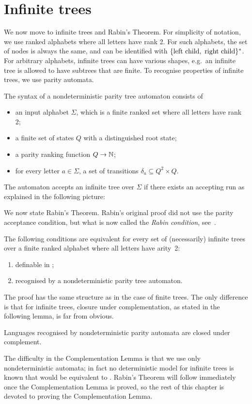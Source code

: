\cite{Figueira:2017hn}


\section{Infinite trees}
\label{sec:rabin}
We now move to infinite trees and Rabin's Theorem. For simplicity of notation, we use ranked alphabets where all letters have rank 2. For such alphabets, the set of nodes is always the same, and can be identified with $\{\text{left child},\text{ right child}\}^*$. For arbitrary alphabets, infinite trees can have various shapes, e.g.~an infinite tree is allowed to have subtrees that are finite.
To recognise properties of infinite trees, we use parity automata.

\begin{definition}\label{def:nondeterministic-parity}
	The syntax of a nondeterministic parity tree automaton consists of 
	\begin{itemize}
		\item an input alphabet $\Sigma$, which is a finite ranked set where all letters have rank 2;
		\item a finite set of states $Q$ with a distinguished root state;		\item a parity ranking function $Q \to \mathbb{N}$;
		\item for every letter $a 
		\in \Sigma$,  a set of transitions $\delta_a  \subseteq Q^2 \times  Q$.
		 	\end{itemize}
The automaton accepts an infinite tree over $\Sigma$ if there exists an accepting run as explained in the following picture: 
\end{definition}

We now state Rabin's Theorem. Rabin's original proof did not use the parity acceptance condition, but what  is now called the \emph{Rabin condition}, see~\cite{Thomas:1997ec}.
\begin{theorem}\label{thm:rabin} The following conditions are equivalent for every set of  (necessarily) infinite trees over a finite ranked alphabet  where all letters have arity~2:
\begin{enumerate}
	\item definable in \mso;
	\item recognised by a nondeterministic parity tree automaton.
\end{enumerate}
\end{theorem}

The proof has the same structure as in the case of finite trees. The only difference is that for infinite trees, closure under complementation, as stated in the following lemma, is far from obvious. 
\begin{lemma}
  Languages recognised by nondeterministic parity automata are closed under complement.
\end{lemma}
The difficulty in the Complementation Lemma  is that  we use only nondeterministic automata; in fact no deterministic model for infinite trees is known that would be equivalent to \mso. Rabin's Theorem will follow immediately once the Complementation Lemma is proved, so 
 the rest of this chapter is devoted to proving the Complementation Lemma.
 
